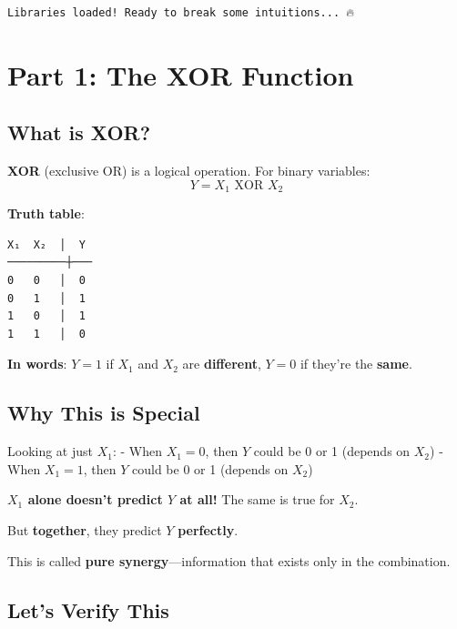 \documentclass[
  11pt,
  letterpaper,
  oneside,
  openany]{book}
\begin{document}
\begin{verbatim}
Libraries loaded! Ready to break some intuitions... 🔥
\end{verbatim}

\section{Part 1: The XOR Function}\label{part-1-the-xor-function}

\subsection{What is XOR?}\label{what-is-xor}

\textbf{XOR} (exclusive OR) is a logical operation. For binary
variables: \[Y = X_1 \text{ XOR } X_2\]

\textbf{Truth table}:

\begin{verbatim}
X₁  X₂  │  Y
─────────┼───
0   0   │  0
0   1   │  1
1   0   │  1
1   1   │  0
\end{verbatim}

\textbf{In words}: \(Y = 1\) if \(X_1\) and \(X_2\) are
\textbf{different}, \(Y = 0\) if they're the \textbf{same}.

\subsection{Why This is Special}\label{why-this-is-special}

Looking at just \(X_1\): - When \(X_1 = 0\), then \(Y\) could be 0 or 1
(depends on \(X_2\)) - When \(X_1 = 1\), then \(Y\) could be 0 or 1
(depends on \(X_2\))

\textbf{\(X_1\) alone doesn't predict \(Y\) at all!} The same is true
for \(X_2\).

But \textbf{together}, they predict \(Y\) \textbf{perfectly}.

This is called \textbf{pure synergy}---information that exists only in
the combination.

\subsection{Let's Verify This}\label{lets-verify-this}
\end{document}
